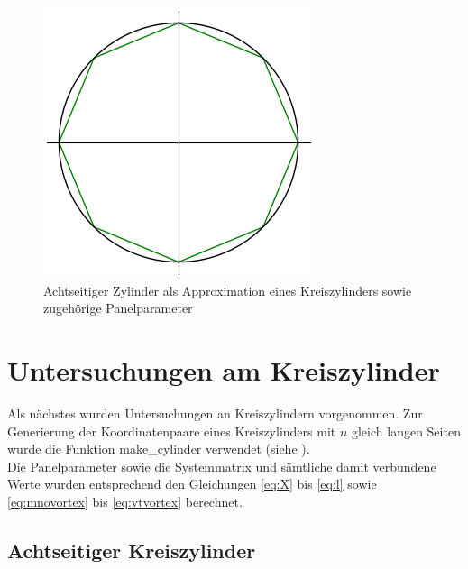 \begin{figure}[!h]
\begin{center}
\includegraphics[scale=0.7]{figures/cylinderascircle.png} 
\caption{Achtseitiger Zylinder als Approximation eines Kreiszylinders sowie zugehörige Panelparameter}
\label{fig:cylinder8}
\end{center}
\end{figure}
\section{Untersuchungen am  Kreiszylinder}

Als nächstes wurden Untersuchungen an Kreiszylindern vorgenommen. Zur Generierung der Koordinatenpaare eines Kreiszylinders mit $n$ gleich langen Seiten wurde die Funktion make\_cylinder verwendet (siehe ). \\
Die Panelparameter sowie die Systemmatrix und sämtliche damit verbundene Werte wurden entsprechend den Gleichungen \eqref{eq:X} bis \eqref{eq:l} sowie \eqref{eq:mnovortex} bis \eqref{eq:vtvortex} berechnet. 

\subsection{Achtseitiger Kreiszylinder}
